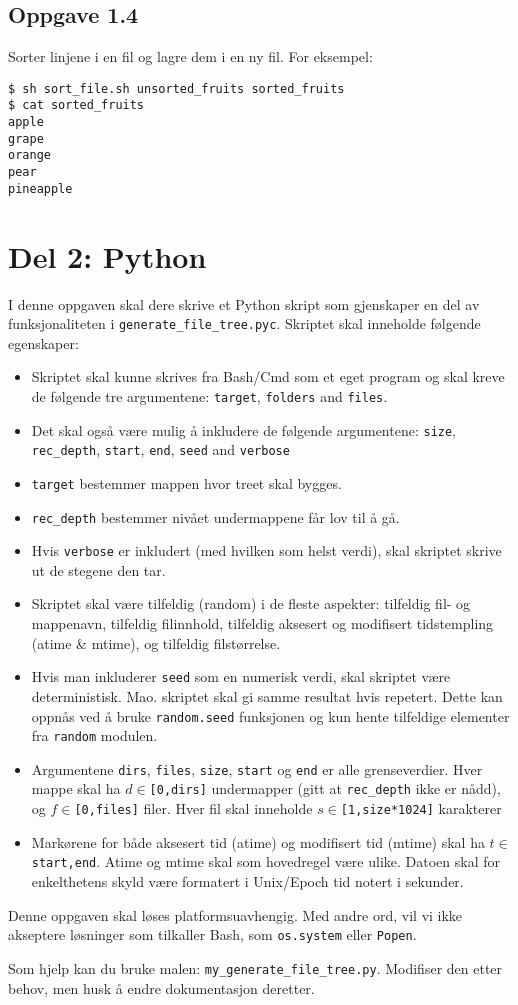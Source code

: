 \documentclass{article}
\begin{document}
\subsection*{Oppgave 1.4}
Sorter linjene i en fil og lagre dem i en ny fil.
For eksempel:
\begin{Verbatim}[fontsize=\small, frame=single]
$ sh sort_file.sh unsorted_fruits sorted_fruits
$ cat sorted_fruits
apple
grape
orange
pear
pineapple
\end{Verbatim}

\section*{Del 2: Python}

I denne oppgaven skal dere skrive et Python skript som gjenskaper
en del av funksjonaliteten i \verb;generate_file_tree.pyc;.
Skriptet skal inneholde følgende egenskaper:
\begin{itemize}
    \item Skriptet skal kunne skrives fra Bash/Cmd som et eget
        program og skal kreve de følgende tre argumentene:
        \verb;target;, \verb;folders; and \verb;files;.
    \item Det skal også være mulig å inkludere de følgende
        argumentene:
        \verb;size;, \verb;rec_depth;, \verb;start;, \verb;end;,
        \verb;seed; and \verb;verbose;
    \item \verb;target; bestemmer mappen hvor treet skal bygges.
    \item \verb;rec_depth; bestemmer nivået undermappene får lov til
        å gå.
    \item Hvis \verb;verbose; er inkludert (med hvilken som helst
        verdi), skal skriptet skrive ut de stegene den tar.
    \item Skriptet skal være tilfeldig (random) i de fleste
        aspekter:
        tilfeldig fil- og mappenavn, tilfeldig filinnhold,
        tilfeldig aksesert og modifisert tidstempling (atime \&
        mtime), og tilfeldig filstørrelse.
    \item Hvis man inkluderer \verb;seed; som en numerisk verdi,
        skal skriptet være deterministisk.
        Mao. skriptet skal gi samme resultat hvis repetert.
        Dette kan oppnås ved å bruke \verb;random.seed; funksjonen
        og kun hente tilfeldige elementer fra \verb;random;
        modulen.
    \item Argumentene \verb;dirs;, \verb;files;, \verb;size;,
        \verb;start; og \verb;end; er alle grenseverdier.
        Hver mappe skal ha $d\in$\verb;[0,dirs]; undermapper
        (gitt at \verb;rec_depth; ikke er nådd), og
        $f\in$\verb;[0,files]; filer.
        Hver fil skal inneholde $s\in$\verb;[1,size*1024]; karakterer
    \item Markørene for både aksesert tid (atime) og modifisert tid
        (mtime) skal ha $t\in$\verb;start,end;.
        Atime og mtime skal som hovedregel være ulike.
        Datoen skal for enkelthetens skyld være formatert i
        Unix/Epoch tid notert i sekunder.
\end{itemize}

Denne oppgaven skal løses platformsuavhengig.
Med andre ord, vil vi ikke akseptere løsninger som tilkaller Bash,
som \verb;os.system; eller \verb;Popen;.

Som hjelp kan du bruke malen: \verb;my_generate_file_tree.py;.
Modifiser den etter behov, men husk å endre dokumentasjon deretter.
\end{document}
